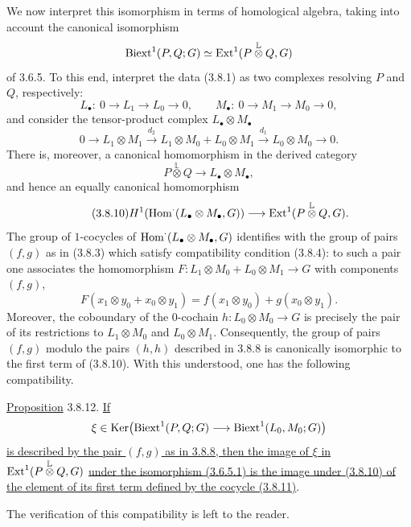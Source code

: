 We now interpret this isomorphism in terms of homological algebra,
taking into account the canonical isomorphism
\[
 \operatorname{Biext}^1(P,Q;G)\simeq
 \operatorname{Ext}^1(P\mathbin{\overset{\mathbb L}{\otimes}}Q,G)
\]
of 3.6.5.  To this end, interpret the data (3.8.1) as two complexes
resolving $P$ and $Q$, respectively:
\begin{equation}\tag{3.8.9}
 L_\bullet:\ 0\longrightarrow L_1\longrightarrow L_0
 \longrightarrow0,\qquad
 M_\bullet:\ 0\longrightarrow M_1\longrightarrow M_0
 \longrightarrow0,
\end{equation}
and consider the tensor-product complex $L_\bullet\otimes M_\bullet$
\[
 0\longrightarrow L_1\otimes M_1
 \xrightarrow{d_2}
 L_1\otimes M_0+L_0\otimes M_1
 \xrightarrow{d_1}
 L_0\otimes M_0\longrightarrow0.
\]
There is, moreover, a canonical homomorphism in the derived category
\[
 P\mathbin{\overset{\mathbb L}{\otimes}}Q
 \longrightarrow L_\bullet\otimes M_\bullet,
\]
and hence an equally canonical homomorphism
\begin{equation}\tag{3.8.10}
 H^1\!\left(\operatorname{Hom}^{\cdot}(L_\bullet\otimes M_\bullet,G)\right)
 \longrightarrow
 \operatorname{Ext}^1(P\mathbin{\overset{\mathbb L}{\otimes}}Q,G).
\end{equation}
The group of $1$-cocycles of
$\operatorname{Hom}^{\cdot}(L_\bullet\otimes M_\bullet,G)$ identifies with the
group of pairs $(f,g)$ as in (3.8.3) which satisfy compatibility
condition (3.8.4): to such a pair one associates the homomorphism
$F:L_1\otimes M_0+L_0\otimes M_1\longrightarrow G$ with components
$(f,g)$,
\begin{equation}\tag{3.8.11}
 F(x_1\otimes y_0+x_0\otimes y_1)
 =f(x_1\otimes y_0)+g(x_0\otimes y_1).
\end{equation}
Moreover, the coboundary of the $0$-cochain
$h:L_0\otimes M_0\longrightarrow G$ is precisely the pair of its
restrictions to $L_1\otimes M_0$ and $L_0\otimes M_1$.  Consequently,
the group of pairs $(f,g)$ modulo the pairs $(h,h)$ described in
3.8.8 is canonically isomorphic to the first term of (3.8.10).
With this understood, one has the following compatibility.

\underline{Proposition} 3.8.12.
\underline{If}
\[
 \xi\in\operatorname{Ker}\!\left(
 \operatorname{Biext}^1(P,Q;G)\longrightarrow\operatorname{Biext}^1(L_0,M_0;G)\right)
\]
\underline{is described by the pair $(f,g)$ as in 3.8.8, then the
image of $\xi$ in}
$\operatorname{Ext}^1(P\mathbin{\overset{\mathbb L}{\otimes}}Q,G)$
\underline{under the isomorphism (3.6.5.1) is the image under
(3.8.10) of the element of its first term defined by the cocycle
(3.8.11)}.

The verification of this compatibility is left to the reader.

